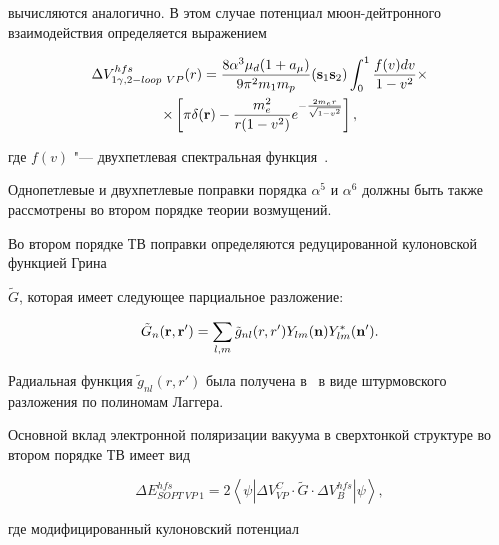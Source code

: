 вычисляются аналогично. В этом случае потенциал мюон-дейтронного взаимодействия определяется выражением

\begin{multline}

\label{eq:1gamma2loop1pot}

\Delta V_{1\gamma,2-loop~VP}^{hfs}(r)=\frac{8\alpha^3\mu_d(1+a_\mu)}{9\pi^2 m_1m_p}({\bf s}_1{\bf s}_2)

\int_0^1\frac{f(v)dv}{1-v^2}\times

\\

\times\left[\pi\delta({\bf r})-\frac{m_e^2}{ r(1-v^2)}e^{-\frac{2m_er}{\sqrt{1-v^2}}}\right],

\end{multline}

где $f(v)$ "--- двухпетлевая спектральная функция~\cite{m3}.

Однопетлевые и двухпетлевые поправки порядка $\alpha^5$ и $\alpha^6$ должны быть также рассмотрены во втором порядке теории возмущений.



Во втором порядке ТВ поправки определяются редуцированной кулоновской функцией Грина

$\tilde G$, которая имеет следующее парциальное разложение:

\begin{equation}

\tilde G_n({\bf r}, {\bf r'})=\sum_{l,m}\tilde g_{nl}(r,r')Y_{lm}({\bf n})

Y_{lm}^\ast({\bf n'}).

\end{equation}

Радиальная функция $\tilde g_{nl}(r,r')$ была получена в~\cite{hameka} в виде штурмовского разложения по полиномам Лаггера.

Основной вклад электронной поляризации вакуума в сверхтонкой структуре во втором порядке ТВ имеет вид

\begin{equation}

\label{eq:soptmainf}

\Delta E^{hfs}_{SOPT~VP~1}=2\left<\psi|\Delta V^C_{VP}\cdot \tilde G\cdot\Delta

V_B^{hfs}|\psi\right>,

\end{equation}

где модифицированный кулоновский потенциал


